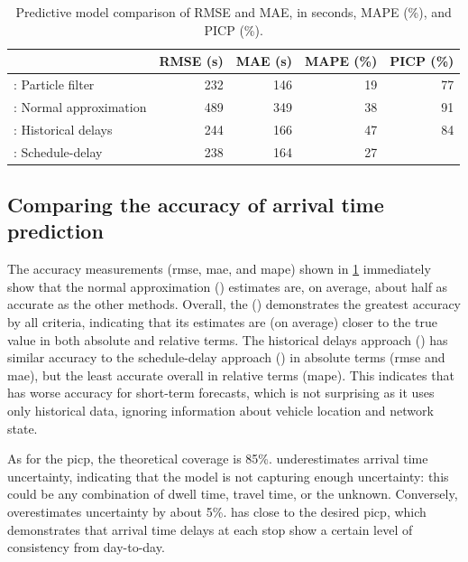 \begin{knitrout}\small
{}\color{fgcolor}\begin{table}

\caption{\label{tab:model_results_rmse}Predictive model comparison of RMSE and MAE, in seconds, MAPE (\%), and PICP (\%).}
\centering
\fontsize{8}{10}\selectfont
\begin{tabular}[t]{lrrrr}
\toprule
  & RMSE (s) & MAE (s) & MAPE (\%) & PICP (\%)\\
\midrule
\Fpf{}: Particle filter & 232 & 146 & 19 & 77\\
\Fnorm{}: Normal approximation & 489 & 349 & 38 & 91\\
\Fhist{}: Historical delays & 244 & 166 & 47 & 84\\
\Fsched{}: Schedule-delay & 238 & 164 & 27 & \\
\bottomrule
\end{tabular}
\end{table}


\end{knitrout}




\subsection{Comparing the accuracy of arrival time prediction}
\label{sec:prediction_model_comp_stats}

The accuracy measurements (\gls{rmse}, \gls{mae}, and \gls{mape}) shown in \cref{tab:model_results_rmse} immediately show that the normal approximation (\Fnorm{}) estimates are, on average, about half as accurate as the other methods. Overall, the \pf{} (\Fpf{}) demonstrates the greatest accuracy by all criteria, indicating that its estimates are (on average) closer to the true value in both absolute and relative terms. The historical delays approach (\Fhist{}) has similar accuracy to the schedule-delay approach (\Fsched{}) in absolute terms (\gls{rmse} and \gls{mae}), but the least accurate overall in relative terms (\gls{mape}). This indicates that \Fhist{} has worse accuracy for short-term forecasts, which is not surprising as it uses only historical data, ignoring \rt{} information about vehicle location and network state.


As for the \gls{picp}, the theoretical coverage is 85\%. \Fpf{} underestimates arrival time uncertainty, indicating that the model is not capturing enough uncertainty: this could be any combination of dwell time, travel time, or the unknown. Conversely, \Fnorm{} overestimates uncertainty by about 5\%. \Fhist{} has close to the desired \gls{picp}, which demonstrates that arrival time delays at each stop show a certain level of consistency from day-to-day.


